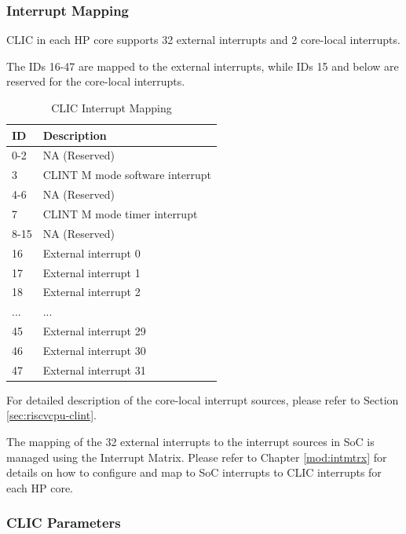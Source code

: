 \documentclass[main\_\_EN.tex]{subfiles}
\begin{document}
\hypertarget{riscvcpu-clic-intmap}{}
\subsubsection{Interrupt Mapping}
\label{sec:riscvcpu-clic-intmap}

CLIC in each HP core supports 32 external interrupts and 2 core-local interrupts.

The IDs 16-47 are mapped to the external interrupts, while IDs 15 and below are reserved for the core-local interrupts.

\begin{longtable}{ | l | l | }
\caption{CLIC Interrupt Mapping}
\label{tab:riscvcpu-clic-intmap-table}
\\ \hline
\rowcolor{lightgray}
ID & Description \\ \hline
0-2 & NA (Reserved) \\ \hline
3 & CLINT M mode software interrupt \\ \hline
4-6 & NA (Reserved) \\ \hline
7 & CLINT M mode timer interrupt \\ \hline
8-15 & NA (Reserved) \\ \hline
16 & External interrupt 0 \\ \hline
17 & External interrupt 1 \\ \hline
18 & External interrupt 2 \\ \hline
... & ... \\ \hline
45 & External interrupt 29 \\ \hline
46 & External interrupt 30 \\ \hline
47 & External interrupt 31 \\ \hline
\end{longtable}

For detailed description of the core-local interrupt sources, please refer to Section \ref{sec:riscvcpu-clint}.

The mapping of the 32 external interrupts to the interrupt sources in SoC is managed using the Interrupt Matrix. Please refer to Chapter \ref{mod:intmtrx} \textit{} for details on how to configure and map to SoC interrupts to CLIC interrupts for each HP core.

\hypertarget{riscvcpu-clic-params}{}
\subsubsection{CLIC Parameters}
\label{sec:riscvcpu-clic-params}
\end{document}
